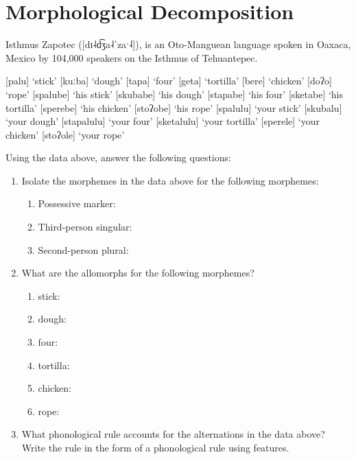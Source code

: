\documentclass[12pt, letterpaper]{article}
\begin{document}
\section{Morphological Decomposition} 

Isthmus Zapotec ([dɪ˨d͡ʒa˨ˈzaˑ˨]), is an Oto-Manguean language spoken in Oaxaca, Mexico by 104,000 speakers on the Isthmus of Tehuantepec.

\ea
\begin{multicols}{3} 
	\ea {}[palu] `stick'
	\ex {}[kuːba] `dough'
	\ex {}[tapa]	`four'
	\ex {}[geta] `tortilla'
	\ex {}[bere] `chicken'
	\ex {}[doʔo] `rope'
	\ex {}[spalube] `his stick'
	\ex {}[skubabe] `his dough'
	\ex {}[stapabe] `his four'
	\ex {}[sketabe] `his tortilla'
	\ex {}[sperebe] `his chicken'
	\ex {}[stoʔobe] `his rope'
	\ex {}[spalulu] `your stick'
	\ex {}[skubalu] `your dough'
	\ex {}[stapalulu] `your four'
	\ex {}[sketalulu] `your tortilla'
	\ex {}[sperele] `your chicken'
	\ex {}[stoʔole] `your rope'
	\z 
\end{multicols}
\z 

Using the data above, answer the following questions:

\begin{enumerate}
	\item Isolate the morphemes in the data above for the following morphemes:
	\begin{enumerate}
		\item Possessive marker: 
		\item Third-person singular: 
		\item Second-person plural: 
	\end{enumerate}
	\item What are the allomorphs for the following morphemes?
	\begin{enumerate}
		\item stick: 
		\item dough:  
		\item four: 
		\item tortilla: 
		\item chicken: 
		\item rope: 
	\end{enumerate}

	\item What phonological rule accounts for the alternations in the data above? Write the rule in the form of a phonological rule using features.
\end{enumerate}

\printbibliography[heading=bibintoc]
\end{document}
